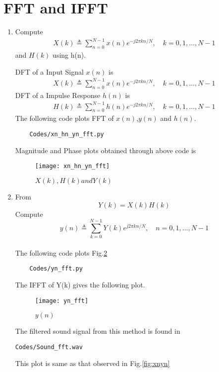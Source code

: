 \documentclass[journal,12pt,twocolumn]{IEEEtran}
\renewcommand\thesection{\arabic{section}}
\begin{document}
\section{FFT and IFFT}
\begin{enumerate}[label=\thesection.\arabic*
,ref=\thesection.\theenumi]
\item Compute
\begin{align}
        X(k) \triangleq \sum_{n=0}^{N-1} x(n) e^{-j 2 \pi k n / N}, \quad k=0,1, \ldots, N-1
\end{align}
and $H(k)$ using h(n).
\\
\solution

DFT of a Input Signal $x(n)$ is 
\begin{align}
    X(k) \triangleq \sum_{n=0}^{N-1} x(n) e^{-j 2 \pi k n / N}, \quad k=0,1, \ldots, N-1
\end{align}
DFT of a Impulse Response $h(n)$ is 
\begin{align}
    H(k) \triangleq \sum_{n=0}^{N-1} h(n) e^{-j 2 \pi k n / N}, \quad k=0,1, \ldots, N-1
\end{align}
The following code plots FFT of $x(n)$,$y(n)$ and $h(n)$.
\begin{lstlisting}
    Codes/xn_hn_yn_fft.py
\end{lstlisting}
Magnitude and Phase plots obtained through above code is 
\begin{figure}[!ht]
\centering
\texttt{[image: xn\_hn\_yn\_fft]}
\caption{$X(k), H(k) and Y(k)$}
\label{fig:xnhnfft}
\end{figure}
\item From
\begin{equation}
Y(k) = X(k)H(k)
\end{equation}
Compute
\begin{equation}
y(n) \triangleq \sum_{k=0}^{N-1} Y(k) e^{j 2 \pi k n / N}, \quad n=0,1, \ldots, N-1
\end{equation}
\\
\solution
The following code plots Fig.\ref{fig:ynfft}
\begin{lstlisting}
    Codes/yn_fft.py
\end{lstlisting}
The IFFT of Y(k) gives the following plot.\\
\begin{figure}[!ht]
\centering
\texttt{[image: yn\_fft]}
\caption{$y(n)$}
\label{fig:ynfft}
\end{figure}
The filtered sound signal from this method is found in
\begin{lstlisting}
Codes/Sound_fft.wav
\end{lstlisting}
This plot is same as that observed in Fig.\ref{fig:xnyn}
\end{enumerate}
\end{document}

